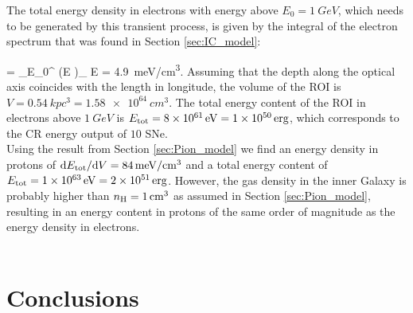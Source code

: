 The total energy density in electrons with energy above $E_0 = \SI{1}{GeV}$, which needs to be generated by this transient process, is given by the integral of the electron spectrum that was found in Section \ref{sec:IC_model}:

\be
{} = \int_{E_0}^{\infty} \left(E \right)_{\!\!\el} \de E = \SI{4.9}{meV/cm^3}.
\ee
Assuming that the depth along the optical axis coincides with the length in longitude, the volume of the ROI is $V = \SI{0.54}{kpc^3} = \SI{1.58e64}{cm^3}$. The total energy content of the ROI in electrons above $\SI{1}{GeV}$ is $E_{\text{tot}} = \SI{8e61}{eV} = \SI{1e50}{erg}$, which corresponds to the CR energy output of $10$ SNe.\\
Using the result from Section \ref{sec:Pion_model} we find an energy density in protons of $\text{d} E_{\text{tot}} / \text{d} V = \SI{84}{meV/cm^3}$ and a total energy content of $E_{\text{tot}} = \SI{1e63}{eV} = \SI{2e51}{erg}$. However, the gas density in the inner Galaxy is probably higher than $n_{\text{H}} = \SI{1}{/cm^3}$ as assumed in Section \ref{sec:Pion_model}, resulting in an energy content in protons of the same order of magnitude as the energy density in electrons. \\
\\


\section{Conclusions}